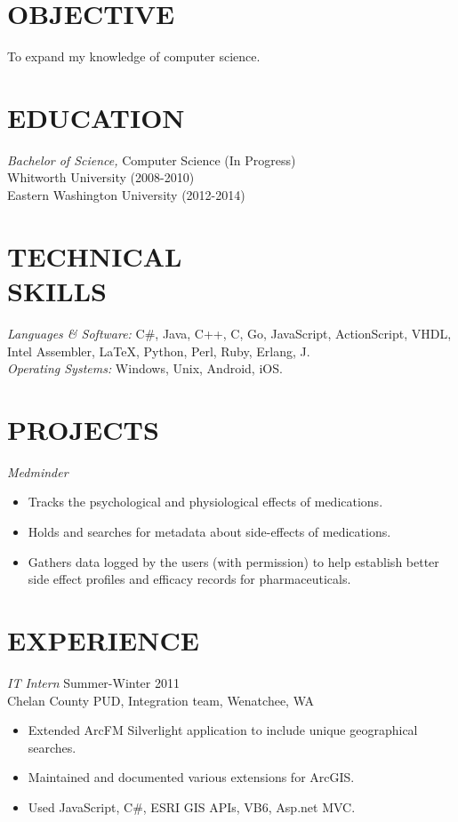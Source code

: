 \documentclass[line,margin]{res}
\begin{document}
\address{905 Elm St., LA Hall, Room 142, Cheney, WA, 99004}
\address{509-699-1184}
\address{ericfode@gmail.com}

 
\begin{resume}
 
\section{OBJECTIVE}       
				To expand my knowledge of computer science.
 
 
\section{EDUCATION} {\sl Bachelor of Science,} Computer Science (In Progress)\\
					Whitworth University (2008-2010) \\
					Eastern Washington University (2012-2014)
 
 
\section{TECHNICAL \\ SKILLS} {\sl Languages \& Software:} C\#, Java, C++, C, Go,  JavaScript, ActionScript, VHDL, Intel Assembler, \LaTeX, Python, Perl, Ruby, Erlang, J.\\
                {\sl Operating Systems:} Windows, Unix, Android, iOS.
                
\section{PROJECTS} {\sl Medminder}
                 \begin{itemize}  \itemsep -2pt %
                	\item Tracks the psychological and physiological effects of medications.
                	\item Holds and searches for metadata about side-effects of medications.
                	\item Gathers data logged by the users (with permission) to help establish better side effect profiles and efficacy records for pharmaceuticals.
                \end{itemize}
\section{EXPERIENCE} 
 				{\sl IT Intern} \hfill Summer-Winter 2011\\
				Chelan County PUD, Integration team, Wenatchee, WA
                 \begin{itemize}  \itemsep -2pt %
					 \item Extended	ArcFM Silverlight application to include unique geographical searches.
					 \item Maintained and documented various extensions for ArcGIS.
					 \item Used JavaScript, C\#, ESRI GIS APIs, VB6, Asp.net MVC.
				 \end{itemize}
				 

\end{resume}
\end{document}
